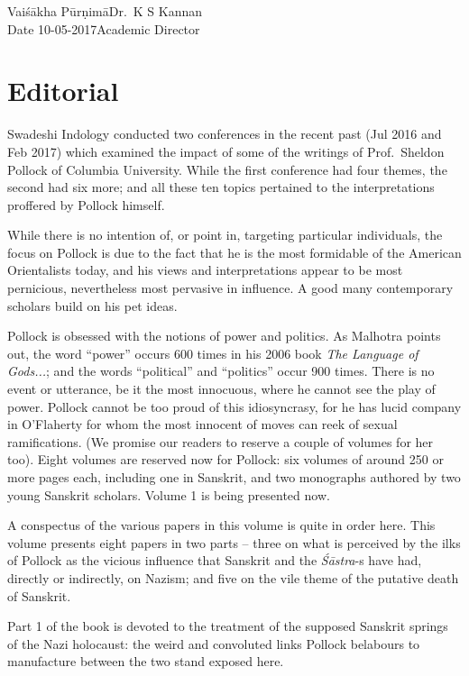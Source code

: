 \noindent
Vaiśākha Pūrṇimā\hfill	Dr.~K S Kannan\\
Date 10-05-2017\hfill	Academic Director

\chapter*{Editorial}\label{editorial}

\vskip 9pt

Swadeshi Indology conducted two conferences in the recent past (Jul 2016 and Feb 2017) which examined the impact of some of the writings of Prof.\ Sheldon Pollock of Columbia University. While the first conference had four themes, the second had six more; and all these ten topics pertained to the interpretations proffered by Pollock himself.
\vskip 1.5pt

While there is no intention of, or point in, targeting particular individuals, the focus on Pollock is due to the fact that he is the most formidable of the American Orientalists today, and his views and interpretations appear to be most pernicious, nevertheless most pervasive in influence. A good many contemporary scholars build on his pet ideas. 
\vskip 1.5pt

Pollock is obsessed with the notions of power and politics. As Malhotra points out, the word “power” occurs 600 times in his 2006 book {\sl The Language of Gods...}; and the words “political” and “politics” occur 900 times. There is no event or utterance, be it the most innocuous, where he cannot see the play of power. Pollock cannot be too proud of this idiosyncrasy, for he has lucid company in O’Flaherty for whom the most innocent of moves can reek of sexual ramifications. (We promise our readers to reserve a couple of volumes for her too). Eight volumes are reserved now for Pollock: six volumes of around 250 or more pages each, including one in Sanskrit, and two monographs authored by two young Sanskrit scholars. Volume 1 is being presented now.
\vskip 1.5pt

A conspectus of the various papers in this volume is quite in order here. This volume presents eight papers in two parts – three on what is perceived by the ilks of Pollock as the vicious influence that Sanskrit and the {\sl Śāstra}-s have had, directly or indirectly, on Nazism; and five on the vile theme of the putative death of Sanskrit.

Part 1 of the book is devoted to the treatment of the supposed Sanskrit springs of the Nazi holocaust: the weird and convoluted links Pollock belabours to manufacture between the two stand exposed here. 

